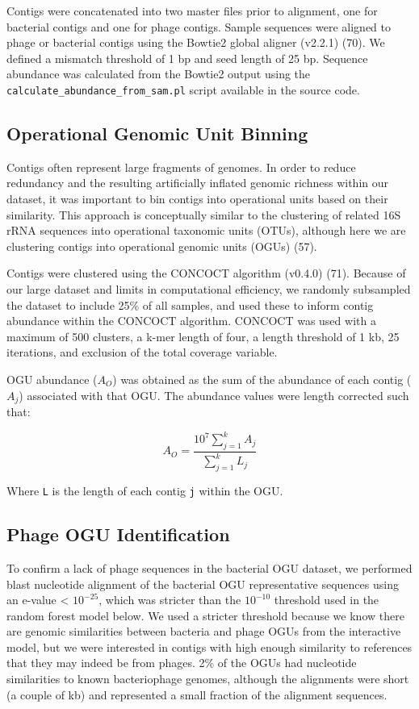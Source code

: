 \documentclass[12pt,]{article}
\begin{document}
Contigs were concatenated into two master files prior to alignment, one
for bacterial contigs and one for phage contigs. Sample sequences were
aligned to phage or bacterial contigs using the Bowtie2 global aligner
(v2.2.1) (70). We defined a mismatch threshold of 1 bp and seed length
of 25 bp. Sequence abundance was calculated from the Bowtie2 output
using the \texttt{calculate\_abundance\_from\_sam.pl} script available
in the source code.

\subsection{Operational Genomic Unit
Binning}\label{operational-genomic-unit-binning}

Contigs often represent large fragments of genomes. In order to reduce
redundancy and the resulting artificially inflated genomic richness
within our dataset, it was important to bin contigs into operational
units based on their similarity. This approach is conceptually similar
to the clustering of related 16S rRNA sequences into operational
taxonomic units (OTUs), although here we are clustering contigs into
operational genomic units (OGUs) (57).

Contigs were clustered using the CONCOCT algorithm (v0.4.0) (71).
Because of our large dataset and limits in computational efficiency, we
randomly subsampled the dataset to include 25\% of all samples, and used
these to inform contig abundance within the CONCOCT algorithm. CONCOCT
was used with a maximum of 500 clusters, a k-mer length of four, a
length threshold of 1 kb, 25 iterations, and exclusion of the total
coverage variable.

OGU abundance (\(A_{O}\)) was obtained as the sum of the abundance of
each contig (\(A_{j}\)) associated with that OGU. The abundance values
were length corrected such that:

\[ { A }_{ O }=\frac { { 10 }^{ 7 }\sum _{ j=1 }^{ k }{ { A }_{ j } }  }{ \sum _{ j=1 }^{ k }{ { L }_{ j } }  } \]

Where \texttt{L} is the length of each contig \texttt{j} within the OGU.

\subsection{Phage OGU Identification}\label{phage-ogu-identification}

To confirm a lack of phage sequences in the bacterial OGU dataset, we
performed blast nucleotide alignment of the bacterial OGU representative
sequences using an e-value \textless{} \(10^{-25}\), which was stricter
than the \(10^{-10}\) threshold used in the random forest model below.
We used a stricter threshold because we know there are genomic
similarities between bacteria and phage OGUs from the interactive model,
but we were interested in contigs with high enough similarity to
references that they may indeed be from phages. 2\% of the OGUs had
nucleotide similarities to known bacteriophage genomes, although the
alignments were short (a couple of kb) and represented a small fraction
of the alignment sequences.
\end{document}
